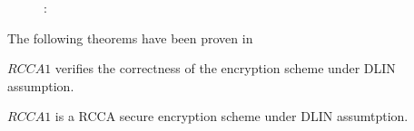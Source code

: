 \begin{description}
\item[]:
  

\end{description}

The following theorems have been proven in~\cite{DBLP:conf/eurocrypt/ChaseKLM12}

\begin{myTh}
  $RCCA1$ verifies the correctness of the encryption scheme under DLIN assumption.
\end{myTh}

\begin{myTh}
  $RCCA1$ is a RCCA secure encryption scheme under DLIN assumtption.
\end{myTh}


%
